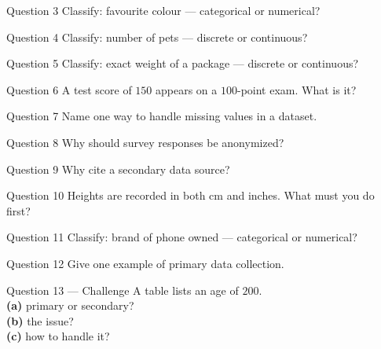 \documentclass[11pt]{article}
\begin{document}
\begin{qbox}{Question 3}
Classify: favourite colour --- categorical or numerical?\workspace{2.4cm}
\end{qbox}

\begin{qbox}{Question 4}
Classify: number of pets --- discrete or continuous?\workspace{2.4cm}
\end{qbox}

\begin{qbox}{Question 5}
Classify: exact weight of a package --- discrete or continuous?\workspace{2.4cm}
\end{qbox}

\begin{qbox}{Question 6}
A test score of $150$ appears on a $100$-point exam. What is it?\workspace{2.4cm}
\end{qbox}

\begin{qbox}{Question 7}
Name one way to handle missing values in a dataset.\workspace{2.4cm}
\end{qbox}

\begin{qbox}{Question 8}
Why should survey responses be anonymized?\workspace{2.4cm}
\end{qbox}

\begin{qbox}{Question 9}
Why cite a secondary data source?\workspace{2.4cm}
\end{qbox}

\begin{qbox}{Question 10}
Heights are recorded in both cm and inches. What must you do first?\workspace{2.4cm}
\end{qbox}

\begin{qbox}{Question 11}
Classify: brand of phone owned --- categorical or numerical?\workspace{2.4cm}
\end{qbox}

\begin{qbox}{Question 12}
Give one example of primary data collection.\workspace{2.4cm}
\end{qbox}

\begin{qbox}{Question 13 --- Challenge}
A table lists an age of $200$. \\ \textbf{(a)} primary or secondary? \\ \textbf{(b)} the issue? \\ \textbf{(c)} how to handle it?\workspace{3cm}
\end{qbox}
\end{document}
